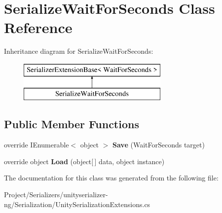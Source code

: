 \hypertarget{class_serialize_wait_for_seconds}{}\section{Serialize\+Wait\+For\+Seconds Class Reference}
\label{class_serialize_wait_for_seconds}
Inheritance diagram for Serialize\+Wait\+For\+Seconds\+:\begin{figure}[H]
\begin{center}
\leavevmode
\includegraphics[height=2.000000cm]{class_serialize_wait_for_seconds}
\end{center}
\end{figure}
\subsection*{Public Member Functions}
\begin{DoxyCompactItemize}
\item 
\mbox{\label{class_serialize_wait_for_seconds_aa62dde11ef51cf1093957eb61841816e}} 
override I\+Enumerable$<$ object $>$ {\bfseries Save} (Wait\+For\+Seconds target)
\item 
\mbox{\label{class_serialize_wait_for_seconds_a458c026ee7885ad2740dde5205b94eb7}} 
override object {\bfseries Load} (object\mbox{[}$\,$\mbox{]} data, object instance)
\end{DoxyCompactItemize}


The documentation for this class was generated from the following file\+:\begin{DoxyCompactItemize}
\item 
Project/\+Serializers/unityserializer-\/ng/\+Serialization/Unity\+Serialization\+Extensions.\+cs\end{DoxyCompactItemize}
